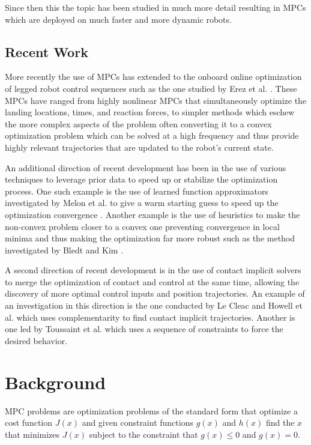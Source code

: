 \documentclass[conference]{IEEEtran}
\begin{document}
Since then this the topic has been studied in much more detail resulting in MPCs which are deployed on much faster and more dynamic robots.

\subsection{Recent Work}

More recently the use of MPCs has extended to the onboard online optimization of legged robot control sequences such as the one studied by Erez et al. \cite{erez_integrated_2013}.
These MPCs have ranged from highly nonlinear MPCs that simultaneously optimize the landing locations, times, and reaction forces, to simpler methods which eschew the more complex aspects of the problem often converting it to a convex optimization problem which can be solved at a high frequency and thus provide highly relevant trajectories that are updated to the robot's current state.

An additional direction of recent development has been in the use of various techniques to leverage prior data to speed up or stabilize the optimization process.
One such example is the use of learned function approximators investigated by Melon et al. to give a warm starting guess to speed up the optimization convergence \cite{melon_receding-horizon_2021}.
Another example is the use of heuristics to make the non-convex problem closer to a convex one preventing convergence in local minima and thus making the optimization far more robust such as the method investigated by Bledt and Kim \cite{bledt_extracting_2020}.

A second direction of recent development is in the use of contact implicit solvers to merge the optimization of contact and control at the same time, allowing the discovery of more optimal control inputs and position trajectories.
An example of an investigation in this direction is the one conducted by Le Cleac and Howell et al. \cite{cleach_fast_2023} which uses complementarity to find contact implicit trajectories.
Another is one led by Toussaint et al. \cite{toussaint_sequence--constraints_2022} which uses a sequence of constraints to force the desired behavior.

\section{Background}
\label{sec:background}

MPC problems are optimization problems of the standard form that optimize a cost function \(J(x)\) and given constraint functions \(g(x)\) and \(h(x)\) find the \(x\) that minimizes \(J(x)\) subject to the constraint that \(g(x)\leq0\) and \(g(x)=0\).
\end{document}
